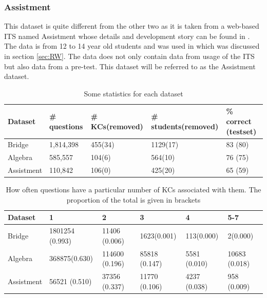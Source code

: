 \documentclass{scrartcl}
\begin{document}
\subsubsection{Assistment}
This dataset is quite different from the other two as it is taken from a web-based ITS named Assistment whose details and development story can be found in \cite{razzaq}. The data is from 12 to 14 year old students and was used in \cite{ktpfa} which was discussed in section \ref{sec:RW}. The data does not only contain data from usage of the ITS but also data from a pre-test. This dataset will be referred to as the Assistment dataset.

\begin{table}

    \begin{tabular}{| l | l | l | l |l|}
    \hline
    Dataset & \# questions & \# KCs(removed) &\# students(removed) & \% correct (testset) \\ \hline
    Bridge & 1,814,398 & 455(34) & 1129(17) & 83 (80)\\ \hline
    Algebra & 585,557 & 104(6) & 564(10) &  76 (75)\\ \hline
    Assistment & 110,842  & 106(0) & 425(20) & 65 (59)\\
    \hline
    \end{tabular}
    \label{tab:datdat}
    \caption{Some statistics for each dataset}
\end{table} 
   
\begin{table}
	\begin{tabular}{| l | l | l | l |l | l |}
    \hline
    Dataset & 1 & 2 & 3 & 4 & 5-7\\ \hline
    Bridge & 1801254 (0.993) & 11406 (0.006) & 1623(0.001)&113(0.000)&2(0.000) \\ \hline
    Algebra & 368875(0.630)  & 114600 (0.196) & 85818 (0.147)&5581 (0.010)&10683 (0.018) \\ \hline
    Assistment & 56521 (0.510) & 37356 (0.337) & 11770 (0.106) & 4237 (0.038)&958 (0.009)\\
    \hline
    \end{tabular}
    \label{tab:QKC}
    \caption{How often questions have a particular number of KCs associated with them. The proportion of the total is given in brackets}
\end{table}  

\end{document}
